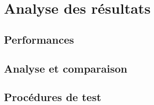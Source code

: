 \chapter{Analyse des résultats}

\section{Performances}

\section{Analyse et comparaison}

\section{Procédures de test}

\clearpage